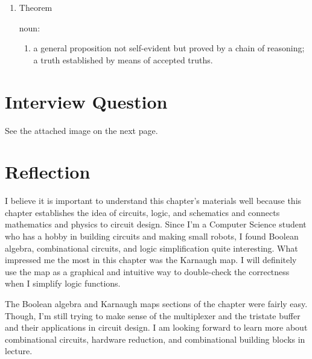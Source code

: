 \documentclass[12pt]{article}
\begin{document}
\begin{enumerate}
    \item{Theorem}

    noun:

    \begin{enumerate}
        \item a general proposition not self-evident but proved by a chain of reasoning; a truth established by means of accepted truths.
    \end{enumerate}
\end{enumerate}

\section{Interview Question}

See the attached image on the next page.



\section{Reflection}

I believe it is important to understand this chapter's materials well because this chapter establishes the idea of circuits, logic, and schematics and connects mathematics and physics to circuit design. Since I'm a Computer Science student who has a hobby in building circuits and making small robots, I found Boolean algebra, combinational circuits, and logic simplification quite interesting. What impressed me the most in this chapter was the Karnaugh map. I will definitely use the map as a graphical and intuitive way to double-check the correctness when I simplify logic functions.

The Boolean algebra and Karnaugh maps sections of the chapter were fairly easy. Though, I'm still trying to make sense of the multiplexer and the tristate buffer and their applications in circuit design. I am looking forward to learn more about combinational circuits, hardware reduction, and combinational building blocks in lecture.

\end{document}
